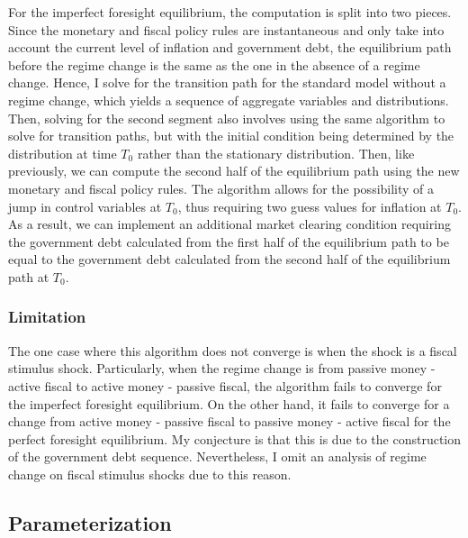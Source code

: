 \documentclass[11pt]{article}
\begin{document}
For the imperfect foresight equilibrium, the computation is split into two pieces. Since the monetary and fiscal policy rules are instantaneous and only take into account the current level of inflation and government debt, the equilibrium path before the regime change is the same as the one in the absence of a regime change. Hence, I solve for the transition path for the standard model without a regime change, which yields a sequence of aggregate variables and distributions. Then, solving for the second segment also involves using the same algorithm to solve for transition paths, but with the initial condition being determined by the distribution at time $T_0$ rather than the stationary distribution. Then, like previously, we can compute the second half of the equilibrium path using the new monetary and fiscal policy rules. The algorithm allows for the possibility of a jump in control variables at $T_0$, thus requiring two guess values for inflation at $T_0$. As a result, we can implement an additional market clearing condition requiring the government debt calculated from the first half of the equilibrium path to be equal to the government debt calculated from the second half of the equilibrium path at $T_0$.

\subsubsection*{Limitation}

The one case where this algorithm does not converge is when the shock is a fiscal stimulus shock. Particularly, when the regime change is from passive money - active fiscal to active money - passive fiscal, the algorithm fails to converge for the imperfect foresight equilibrium. On the other hand, it fails to converge for a change from active money - passive fiscal to passive money - active fiscal for the perfect foresight equilibrium. My conjecture is that this is due to the construction of the government debt sequence. Nevertheless, I omit an analysis of regime change on fiscal stimulus shocks due to this reason.

\subsection{Parameterization}
\end{document}
